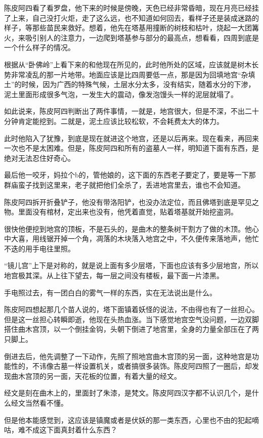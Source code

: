 陈皮阿四看了看罗盘，他下来的时候是傍晚，天色已经非常昏暗，现在月亮已经挂了上来，自己没打火炬，走了这么远，也不知道如何回去，看样子还是装成迷路的样子，等那些苗民来救好。想着，他先在塔基用撞断的树枝和枯叶，烧起一大团篝火，来吸引别人的注意力，一边爬到塔基参与部分的最高点，想看看，四周到底是一个什么样子的情况。

根据从“卧佛岭”上看下来的和他现在所见的，此时他所处的区域，应该就是树木长势非常凌乱的那一片地带。地面应该是比四周要低一点，那是因为回填地宫“杂填土”的时候，因为广西的特殊气候，土层水分太多，没有结实，随着水分的下渗，泥土里面形成很多气泡，一发生大的震动，像发泡馒头一样的泥层就塌了。

如此说来，陈皮阿四判断出了两件事情，一就是，地宫很大，但是不深，不出二十分钟肯定能挖到。二就是，泥土应该比较松软，不会耗费太大的体力。

此时他陷入了犹豫，到底是现在就进这个地宫，还是以后再来。现在看来，再回来一次也不是太困难。但是，陈皮阿四和所有的盗墓人一样，明知道下面有东西，是绝对无法忍住好奇心。

最后他一咬牙，妈拉个b的，管他娘的，这下面的东西老子要定了，要是等一下那群庙蛮子找到这里来，老子就把他们全杀了，丢进地宫里去，谁也不会知道。

陈皮阿四拆开折叠铲子，他没有带洛阳铲，也没办法定位，而且佛塔到底是罕见之物。里面没有棺材，定出来也没有，他凭着直觉，贴着塔基就开始挖盗洞。

很快他便挖到地宫的顶板，不是石头的，是曲木的整条树干割方了做的木顶。他心中大喜，用线锯开掉一个角，凋落的木块落入地宫之中，不久便传来落地声，他忙不迭的用手电往里照。

“镜儿宫”上下是对称的，就是说上面有多少层塔，下面也应该有多少层地宫，所以地宫极其深。从上往下望去，每一层之间没有楼板，最下面一片漆黑。

手电照过去，有一团白白的雾气一样的东西，实在无法说出是什么。

陈皮阿四想起那几个苗人说的，塔下面镇着妖怪的说法，不由得也有了一丝担心。但是这一丝担心转瞬即逝，他现在头热血涨。当下感觉地宫空气没问题，一边双脚搭住曲木宫顶，以一个倒挂金钩，头朝下倒进了地宫里，全身的力量全部压在了两只脚上。

倒进去后，他先调整了一下动作，先照了照地宫曲木宫顶的另一面，这种地宫是功能性的，不讳像古墓一样设置机关，或者搞很多装饰。陈皮阿四照了一圈后，却发现曲木宫顶的另一面，天花板的位置，有着大量的经文。

经文是刻在曲木上的，里面封了朱漆，是梵文。陈皮阿四汉字都不认识几个，是什么经文当然看不懂。

但是他本能感觉到，这应该是镇魔或者是伏妖的那一类东西，心里也不由的犯起嘀咕，难不成这下面真封着什么东西？

